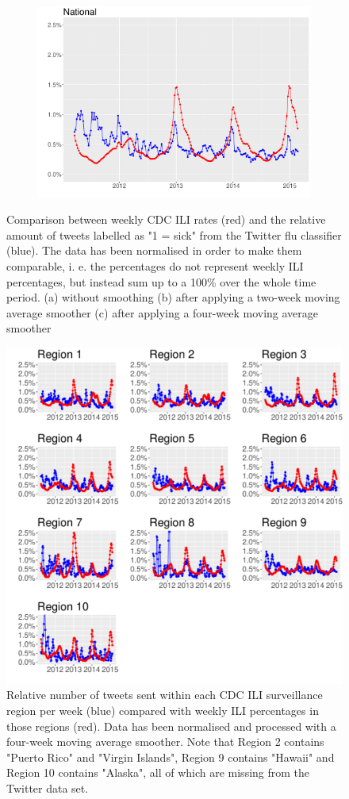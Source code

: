 \documentclass[11pt, a4paper]{article}\usepackage[]{graphicx}\usepackage[]{color}
\begin{document}
\begin{figure}[h]
  \begin{subfigure}[t]{0.6\textwidth}
  \includegraphics[width=1\linewidth,height=0.5\linewidth]{cdc_twitter_comp_nat_ma4.pdf}
  \caption{}
  \label{fig:cdc_tw_comp_nat_ma4}
  \end{subfigure}
  \caption{Comparison between weekly CDC ILI rates (red) and the relative amount of tweets labelled as "1 = sick" from the Twitter flu classifier (blue). The data has been normalised in order to make them comparable, i. e. the percentages do not represent weekly ILI percentages, but instead sum up to a 100\% over the whole time period. (a) without smoothing (b) after applying a two-week moving average smoother (c) after applying a four-week moving average smoother}
\end{figure}

\begin{figure}[h]
\centering
\includegraphics[width=1\linewidth]{cdc_twitter_comp_regs_ma4.pdf}
\caption{Relative number of tweets sent within each CDC ILI surveillance region per week (blue) compared with weekly ILI percentages in those regions (red). Data has been normalised and processed with a four-week moving average smoother. Note that Region 2 contains "Puerto Rico" and "Virgin Islands", Region 9 contains "Hawaii" and Region 10 contains "Alaska", all of which are missing from the Twitter data set.}
\label{fig:cdc_tw_comp_regs_ma4}
\end{figure}
\end{document}
